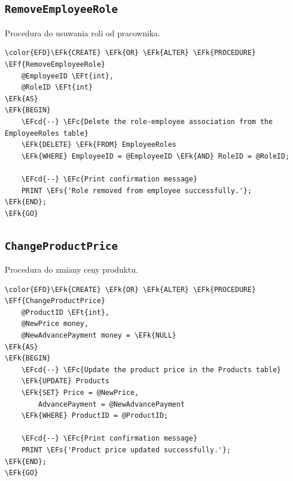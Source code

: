 \documentclass[11pt]{article}
\newcommand{\EFc}[1]{\textcolor{EFc}{\textit{#1}}} %
\newcommand{\EFcd}[1]{\textcolor{EFcd}{\textit{#1}}} %
\newcommand{\EFs}[1]{\textcolor{EFs}{#1}} %
\newcommand{\EFk}[1]{\textcolor{EFk}{\textbf{#1}}} %
\newcommand{\EFf}[1]{\textcolor{EFf}{#1}} %
\newcommand{\EFt}[1]{\textcolor{EFt}{\textbf{#1}}} %
\begin{document}
\subsection{\texttt{RemoveEmployeeRole}}
\label{sec:org2922913}
Procedura do usuwania roli od pracownika.
\begin{Code}
\begin{Verbatim}
\color{EFD}\EFk{CREATE} \EFk{OR} \EFk{ALTER} \EFk{PROCEDURE} \EFf{RemoveEmployeeRole}
    @EmployeeID \EFt{int},
    @RoleID \EFt{int}
\EFk{AS}
\EFk{BEGIN}
    \EFcd{--} \EFc{Delete the role-employee association from the EmployeeRoles table}
    \EFk{DELETE} \EFk{FROM} EmployeeRoles
    \EFk{WHERE} EmployeeID = @EmployeeID \EFk{AND} RoleID = @RoleID;

    \EFcd{--} \EFc{Print confirmation message}
    PRINT \EFs{'Role removed from employee successfully.'};
\EFk{END};
\EFk{GO}
\end{Verbatim}
\end{Code}
\subsection{\texttt{ChangeProductPrice}}
\label{sec:org5285862}
Procedura do zmiany ceny produktu.
\begin{Code}
\begin{Verbatim}
\color{EFD}\EFk{CREATE} \EFk{OR} \EFk{ALTER} \EFk{PROCEDURE} \EFf{ChangeProductPrice}
    @ProductID \EFt{int},
    @NewPrice money,
    @NewAdvancePayment money = \EFk{NULL}
\EFk{AS}
\EFk{BEGIN}
    \EFcd{--} \EFc{Update the product price in the Products table}
    \EFk{UPDATE} Products
    \EFk{SET} Price = @NewPrice,
        AdvancePayment = @NewAdvancePayment
    \EFk{WHERE} ProductID = @ProductID;

    \EFcd{--} \EFc{Print confirmation message}
    PRINT \EFs{'Product price updated successfully.'};
\EFk{END};
\EFk{GO}
\end{Verbatim}
\end{Code}
\end{document}
